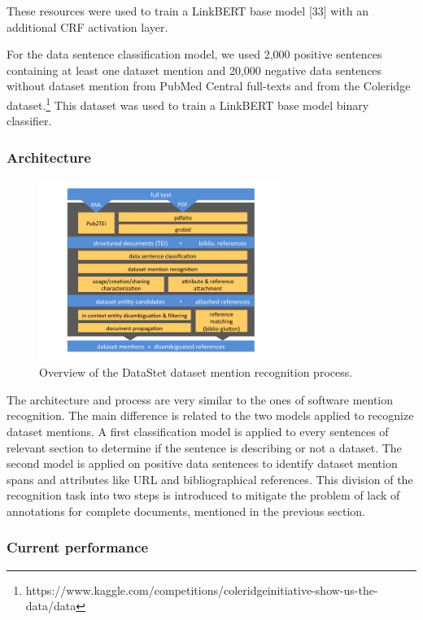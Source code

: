\documentclass[
]{article}
\begin{document}
These resources were used to train a LinkBERT base model {[}33{]} with
an additional CRF activation layer.

For the data sentence classification model, we used 2,000 positive
sentences containing at least one dataset mention and 20,000 negative
data sentences without dataset mention from PubMed Central full-texts
and from the Coleridge dataset.\footnote{https://www.kaggle.com/competitions/coleridgeinitiative-show-us-the-data/data}
This dataset was used to train a LinkBERT base model binary classifier.

\hypertarget{architecture-1}{%
\subsubsection{Architecture}\label{architecture-1}}

\begin{figure}
\centering
\includegraphics[width=0.7\textwidth,height=\textheight]{workflow_dataset_mention.png}
\caption{Overview of the DataStet dataset mention recognition process.}
\end{figure}

The architecture and process are very similar to the ones of software
mention recognition. The main difference is related to the two models
applied to recognize dataset mentions. A first classification model is
applied to every sentences of relevant section to determine if the
sentence is describing or not a dataset. The second model is applied on
positive data sentences to identify dataset mention spans and attributes
like URL and bibliographical references. This division of the
recognition task into two steps is introduced to mitigate the problem of
lack of annotations for complete documents, mentioned in the previous
section.

\hypertarget{current-performance}{%
\subsubsection{Current performance}\label{current-performance}}
\end{document}
